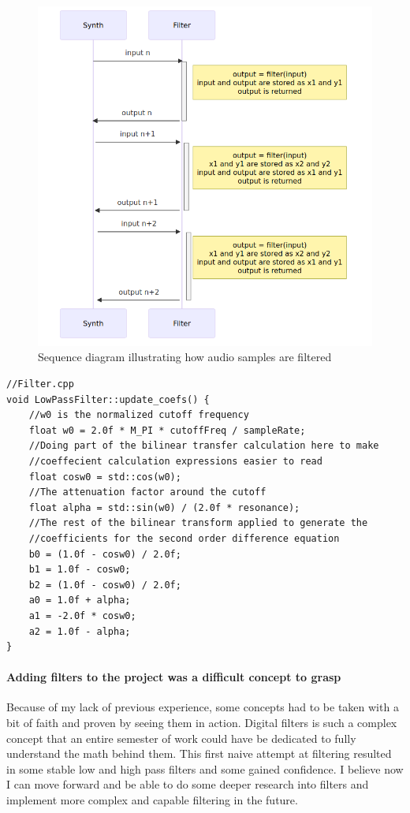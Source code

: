\documentclass[acmlarge,screen]{acmart}
\begin{document}
	
	\begin{figure}
		\centering
		\includegraphics[width=\linewidth]{filter_sequence_diagram}
		\caption{Sequence diagram illustrating how audio samples are filtered}
	\end{figure}
	
	\begin{verbatim}
//Filter.cpp
void LowPassFilter::update_coefs() {
	//w0 is the normalized cutoff frequency
	float w0 = 2.0f * M_PI * cutoffFreq / sampleRate;
	//Doing part of the bilinear transfer calculation here to make
	//coeffecient calculation expressions easier to read
	float cosw0 = std::cos(w0); 
	//The attenuation factor around the cutoff
	float alpha = std::sin(w0) / (2.0f * resonance); 
	//The rest of the bilinear transform applied to generate the 
	//coefficients for the second order difference equation
	b0 = (1.0f - cosw0) / 2.0f;
	b1 = 1.0f - cosw0;
	b2 = (1.0f - cosw0) / 2.0f;
	a0 = 1.0f + alpha;
	a1 = -2.0f * cosw0;
	a2 = 1.0f - alpha;
}
	\end{verbatim}
	
	\paragraph{Adding filters to the project was a difficult concept to grasp} Because of my lack of previous experience, some concepts had to be taken with a bit of faith and proven by seeing them in action. Digital filters is such a complex concept that an entire semester of work could have be dedicated to fully understand the math behind them. This first naive attempt at filtering resulted in some stable low and high pass filters and some gained confidence. I believe now I can move forward and be able to do some deeper research into filters and implement more complex and capable filtering in the future.
	
\end{document}
